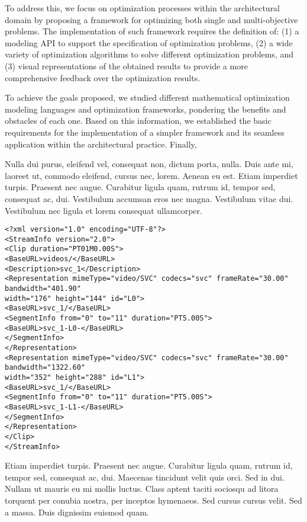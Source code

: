 To address this, we focus on optimization processes within the architectural domain by proposing a framework for optimizing both single and multi-objective problems. The implementation of such framework requires the definition of: (1) a modeling \ac{API} to support the specification of optimization problems, (2) a wide variety of optimization algorithms to solve different optimization problems, and (3) visual representations of the obtained results to provide a more comprehensive feedback over the optimization results.

To achieve the goals proposed, we studied different mathematical optimization modeling languages and optimization frameworks, pondering the benefits and obstacles of each one. Based on this information, we established the basic requirements for the implementation of a simpler framework and its seamless application within the architectural practice. 
Finally, 


Nulla dui purus, eleifend vel, consequat non, dictum porta, nulla. Duis ante mi, laoreet ut, commodo eleifend, cursus nec, lorem. Aenean eu est. Etiam imperdiet turpis. Praesent nec augue. Curabitur ligula quam, rutrum id, tempor sed, consequat ac, dui. Vestibulum accumsan eros nec magna. Vestibulum vitae dui. Vestibulum nec ligula et lorem consequat ullamcorper. 

\begin{lstlisting}[frame=lines,style=XML,caption={Example of a XML file.},label=xmlEx]
<?xml version="1.0" encoding="UTF-8"?>
<StreamInfo version="2.0">
<Clip duration="PT01M0.00S">
<BaseURL>videos/</BaseURL>
<Description>svc_1</Description>
<Representation mimeType="video/SVC" codecs="svc" frameRate="30.00" bandwidth="401.90"
width="176" height="144" id="L0">
<BaseURL>svc_1/</BaseURL>
<SegmentInfo from="0" to="11" duration="PT5.00S">
<BaseURL>svc_1-L0-</BaseURL>
</SegmentInfo>
</Representation>
<Representation mimeType="video/SVC" codecs="svc" frameRate="30.00" bandwidth="1322.60"
width="352" height="288" id="L1">
<BaseURL>svc_1/</BaseURL>
<SegmentInfo from="0" to="11" duration="PT5.00S">
<BaseURL>svc_1-L1-</BaseURL>
</SegmentInfo>
</Representation>
</Clip>
</StreamInfo>
\end{lstlisting}

Etiam imperdiet turpis. Praesent nec augue. Curabitur ligula quam, rutrum id, tempor sed, consequat ac, dui. Maecenas tincidunt velit quis orci. Sed in dui. Nullam ut mauris eu mi mollis luctus. Class aptent taciti sociosqu ad litora torquent per conubia nostra, per inceptos hymenaeos. Sed cursus cursus velit. Sed a massa. Duis dignissim euismod quam.

